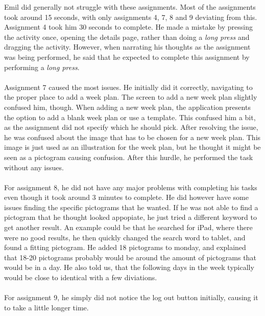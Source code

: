 \noindent
Emil did generally not struggle with these assignments.
Most of the assignments took around 15 seconds, with only assignments 4, 7, 8 and 9 deviating from this.
\\
Assignment 4 took him 30 seconds to complete.
He made a mistake by pressing the activity once, opening the details page, rather than doing a \textit{long press} and dragging the activity.
However, when narrating his thoughts as the assignment was being performed, he said that he expected to complete this assignment by performing a \textit{long press}.
\\\\
Assignment 7 caused the most issues. 
He initially did it correctly, navigating to the proper place to add a week plan. 
The screen to add a new week plan slightly confused him, though.
When adding a new week plan, the application presents the option to add a blank week plan or use a template.
This confused him a bit, as the assignment did not specify which he should pick.
After resolving the issue, he was confused about the image that has to be chosen for a new week plan.
This image is just used as an illustration for the week plan, but he thought it might be seen as a pictogram causing confusion.
After this hurdle, he performed the task without any issues.
\\\\
For assignment 8, he did not have any major problems with completing his tasks even though it took around 3 minutes to complete.
He did however have some issues finding the specific pictograms that he wanted.
If he was not able to find a pictogram that he thought looked appopiate, he just tried a different keyword to get another result. 
An example could be that he searched for iPad, where there were no good results, he then quickly changed the search word to tablet, and found a fitting pictogram.
He added 18 pictograms to monday, and explained that 18-20 pictograms probably would be around the amount of pictograms that would be in a day.
He also told us, that the following days in the week typically would be close to identical with a few diviations.
\\\\
For assignment 9, he simply did not notice the log out button initially, causing it to take a little longer time.

